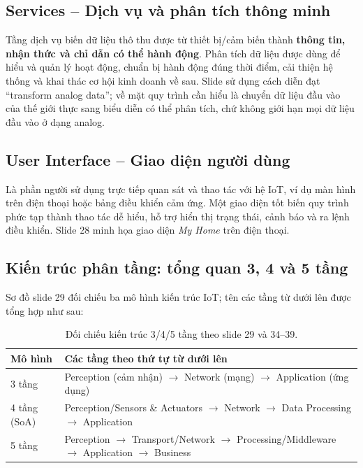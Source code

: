 \subsection{Services -- Dịch vụ và phân tích thông minh}
Tầng dịch vụ biến dữ liệu thô thu được từ thiết bị/cảm biến thành \textbf{thông tin, nhận thức và chỉ dẫn có thể hành động}. Phân tích dữ liệu được dùng để hiểu và quản lý hoạt động, chuẩn bị hành động đúng thời điểm, cải thiện hệ thống và khai thác cơ hội kinh doanh về sau. Slide sử dụng cách diễn đạt ``transform analog data''; về mặt quy trình cần hiểu là chuyển dữ liệu đầu vào của thế giới thực sang biểu diễn có thể phân tích, chứ không giới hạn mọi dữ liệu đầu vào ở dạng analog.

\subsection{User Interface -- Giao diện người dùng}
Là phần người sử dụng trực tiếp quan sát và thao tác với hệ IoT, ví dụ màn hình trên điện thoại hoặc bảng điều khiển cảm ứng. Một giao diện tốt biến quy trình phức tạp thành thao tác dễ hiểu, hỗ trợ hiển thị trạng thái, cảnh báo và ra lệnh điều khiển. Slide 28 minh họa giao diện \emph{My Home} trên điện thoại.

\subsection{Kiến trúc phân tầng: tổng quan 3, 4 và 5 tầng}
Sơ đồ slide 29 đối chiếu ba mô hình kiến trúc IoT; tên các tầng từ dưới lên được tổng hợp như sau:
\begin{table}[H]\centering\small\caption{Đối chiếu kiến trúc 3/4/5 tầng theo slide 29 và 34--39.}
\begin{tabularx}{\linewidth}{@{}l X@{}}\toprule
Mô hình & Các tầng theo thứ tự từ dưới lên\\\midrule
3 tầng & Perception (cảm nhận) $\to$ Network (mạng) $\to$ Application (ứng dụng)\\
4 tầng (SoA) & Perception/Sensors \& Actuators $\to$ Network $\to$ Data Processing $\to$ Application\\
5 tầng & Perception $\to$ Transport/Network $\to$ Processing/Middleware $\to$ Application $\to$ Business\\\bottomrule
\end{tabularx}\end{table}

